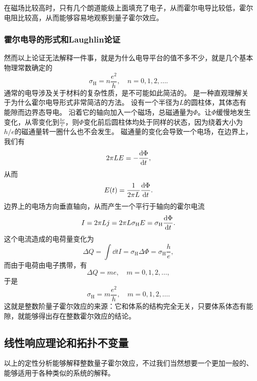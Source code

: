 在磁场比较高时，只有几个朗道能级上面填充了电子，从而霍尔电导比较低，霍尔电阻比较高，从而能够容易地观察到量子霍尔效应。

\subsubsection{霍尔电导的形式和Laughlin论证}

然而以上论证无法解释一件事，就是为什么电导平台的值不多不少，就是几个基本物理常数确定的
\[
    \sigma_\text{H} = n \frac{e^2}{h}, \quad n = 0, 1, 2, \ldots.
\]
通常的电导涉及关于材料的复杂性质，是不可能如此简洁的。
是一种直观理解关于为什么霍尔电导形式非常简洁的方法。
设有一个半径为$L$的圆柱体，其体态有能隙而边界态导电。
沿着它的轴向加入一个磁场，总磁通量为$\Phi$。让$\Phi$缓慢地发生变化，从零变化到$\frac{h c}{e}$，则$\Phi$变化前后圆柱体均处于同样的状态，因为绕着大小为$h / e$的磁通量转一圈什么也不会发生。
磁通量的变化会导致一个电场，在边界上，我们有
\[
    2 \pi L E = - \dv{\Phi}{t},
\]
从而
\[
    E(t) = \frac{1}{2\pi L} \dv{\Phi}{t}.
\]
边界上的电场方向垂直轴向，从而产生一个平行于轴向的霍尔电流
\[
    I = 2 \pi L j = 2 \pi L \sigma_\text{H} E = {\sigma_\text{H}} \dv{\Phi}{t}.
\]
这个电流造成的电荷量变化为
\[
    \Delta Q = \int \dd{t} I = {\sigma_\text{H}} \Delta \Phi = \sigma_\text{H} \frac{h}{e},
\]
而由于电荷由电子携带，有
\[
    \Delta Q = me, \quad m = 0, 1, 2, \ldots,
\]
于是
\[
    \sigma_\text{H} = m \frac{e^2}{h}, \quad m = 0, 1, 2, \ldots.
\]
这就是整数阶量子霍尔效应的来源：它和体系的结构完全无关，只要体系体态有能隙，就能够得出存在整数霍尔效应的结论。

\subsection{线性响应理论和拓扑不变量}

以上的定性分析能够解释整数量子霍尔效应，不过我们当然想要一个更加一般的、能够适用于各种类似的系统的解释。



